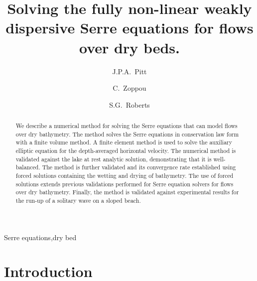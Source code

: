 \documentclass[times]{elsarticle}
\begin{document}
\title{Solving the fully non-linear weakly dispersive Serre equations for flows over dry beds.}

\author[ANU]{J.P.A.~Pitt}
\author[ANU]{C.~Zoppou}
\author[ANU]{S.G.~Roberts}

\address[ANU]{Mathematical Sciences Institute, Australian National University, Canberra, ACT 0200, Australia}
 
 
 \begin{abstract}
 	We describe a numerical method for solving the Serre equations that can model flows over dry bathymetry. The method solves the Serre equations in conservation law form with a finite volume method. A finite element method is used to solve the auxiliary elliptic equation for the depth-averaged horizontal velocity. The numerical method is validated against the lake at rest analytic solution, demonstrating that it is well-balanced. The method is further validated and its convergence rate established using forced solutions containing the wetting and drying of bathymetry. The use of forced solutions extends previous validations performed for Serre equation solvers for flows over dry bathymetry. Finally, the method is validated against experimental results for the run-up of a solitary wave on a sloped beach.

 \end{abstract}	
 
  \begin{keyword}
  	Serre equations\sep dry bed
  \end{keyword}
  
 \maketitle
\linenumbers
\section{Introduction} \label{intro} 

\end{document}
